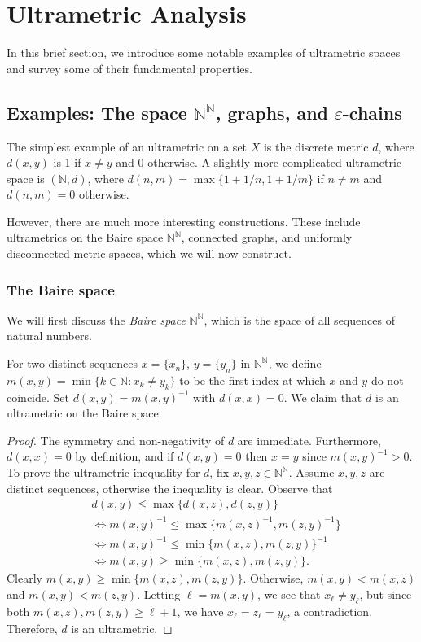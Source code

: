 \section{Ultrametric Analysis}
In this brief section, we introduce some notable examples of ultrametric spaces and survey some of their fundamental properties.
\subsection{Examples: The space \( \mathbb{N} ^{\mathbb{N} } \), graphs, and \( \varepsilon  \)-chains} The simplest example of an ultrametric on a set $X$ is the discrete metric $d$, where $d(x,y)$ is 1 if $x \neq y$ and 0 otherwise. A slightly more complicated ultrametric space is \( (\mathbb{N} , d) \), where \( d(n,m) = \max \{ 1 + 1/n , 1 + 1/m \}  \) if \( n \neq m \) and \( d(n, m) = 0 \) otherwise.

However, there are much more interesting constructions. These include ultrametrics on the Baire space $\mathbb{N} ^{\mathbb{N} }$, connected graphs, and uniformly disconnected metric spaces, which we will now construct.

\subsubsection{The Baire space} We will first discuss the \emph{Baire space} \( \mathbb{N} ^{\mathbb{N} }  \), which is the space of all sequences of natural numbers.

For two distinct sequences \( x =  \{x_{n}\} \), \( y = \{y_{n} \} \) in \( \mathbb{N}^{\mathbb{N}}   \), we define \( m(x,y) = \min \{ k \in \mathbb{N} : x_{k} \neq y_{k}  \}  \) to be the first index at which \( x \) and \( y \) do not coincide. Set \( d(x,y) = m(x,y)^{-1}  \) with \( d(x,x) = 0 \). We claim that \( d \) is an ultrametric on the Baire space.
\begin{proof}
The symmetry and non-negativity of \( d \) are immediate. Furthermore, \( d(x,x) = 0 \) by definition, and if \( d(x,y) = 0  \) then \( x = y \) since \( m(x,y)^{-1} > 0 \). To prove the ultrametric inequality for \( d \), fix \( x,y,z \in \mathbb{N} ^{\mathbb{N} }  \). Assume \( x,y,z \) are distinct sequences, otherwise the inequality is clear. Observe that
\begin{align*}
	&d(x,y) \leq \max \{ d(x,z), d(z,y) \} \\
	&\Leftrightarrow m(x,y)^{-1} \leq \max \{ m(x,z)^{-1} , m(z,y)^{-1}  \}  \\
	&\Leftrightarrow m(x,y)^{-1}  \leq \min \{ m(x,z), m(z,y) \} ^{-1} \\
	&\Leftrightarrow m(x,y) \geq \min \{ m(x,z), m(z,y) \}.
\end{align*}
Clearly \( m(x,y) \geq \min \{ m(x,z), m(z,y) \}  \). Otherwise, \( m(x,y) < m(x,z) \) and \( m(x,y) < m(z,y) \). Letting \( \ell = m(x,y) \), we see that \( x_{\ell} \neq y_{\ell}  \), but since both \( m(x,z), m(z,y) \geq \ell + 1 \), we have \( x_{\ell} = z_{\ell} = y_{\ell}  \), a contradiction. Therefore, \( d \) is an ultrametric.
\end{proof}
